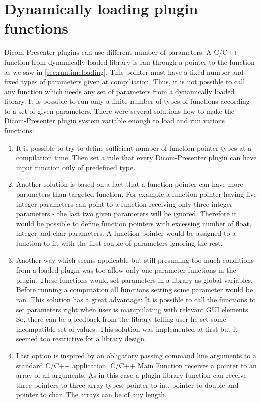 \section{Dynamically loading plugin functions}

Dicom-Presenter plugins can use different number of parameters. A C/C++ function from dynamically loaded library is ran through a pointer to the function as we saw in \ref{sec:runtimeloading}. This pointer must have a fixed number and fixed types of parameters given at compiliation. Thus, it is not possible to call any function which needs any set of parameters from a dynamically loaded library. It is possible to run only a finite number of types of functions according to a set of given parameters. There were several solutions how to make the Dicom-Presenter plugin system variable enough to load and run various functions:

\begin{enumerate}
\item It is possible to try to define sufficient number of function pointer types at a compilation time. Then set a rule that every Dicom-Presenter plugin can have input function only of predefined type.
\item Another solution is based on a fact that a function pointer can have more parameters than targeted function. For example a function pointer having five integer parameters can point to a function receiving only three integer parameters - the last two given parameters will be ignored. Therefore it would be possible to define function pointers with excessing number of float, integer and char parameters. A function pointer would be assigned to a function to fit with the first couple of parameters ignoring the rest.
\item Another way which seems applicable but still presuming too much conditions from a loaded plugin was too allow only one-parameter functions in the plugin. These functions would set parameters in a library as global variables. Before running a computation all functions setting some parameter would be ran. This solution has a great advantage: It is possible to call the functions to set parameters right when user is manipulating with relevant GUI elements. So, there can be a feedback from the library telling user he set some incompatible set of values. This solution was implemented at first but it seemed too restrictive for a library design. 
\item Last option is inspired by an obligatory passing command line arguments to a standard C/C++ application. C/C++ Main Function receives a pointer to an array of all arguments. As in this case a plugin library function can receive three pointers to three array types: pointer to int, pointer to double and pointer to char. The arrays can be of any length.
\end{enumerate}

